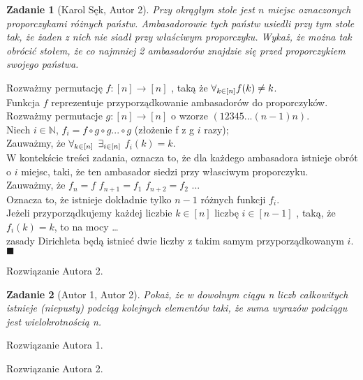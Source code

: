 \documentclass{mwart}
\newcommand{\N}{\mathbb{N}}
\newtheorem{zad}{Zadanie}[section]
\begin{document}
\begin{zad}[Karol Sęk, Autor 2]
    Przy okrągłym stole jest $n$ miejsc oznaczonych proporczykami różnych
    państw. Ambasadorowie tych państw usiedli przy tym stole tak, że żaden z nich nie siadł
    przy właściwym proporczyku. Wykaż, że można tak obrócić stołem, że co najmniej 2
    ambasadorów znajdzie się przed proporczykiem swojego państwa.
\end{zad}
\begin{mdframed}
    Rozważmy permutację $f:[n] \rightarrow [n]$ , taką że $\forall_{\small k\in[n]} f(k) \ne k$.\\
    Funkcja $f$ reprezentuje przyporządkowanie ambasadorów do proporczyków.\\
    Rozważmy permutacje $g:[n] \rightarrow [n]$ o wzorze $(12345...(n-1)n)$.\\
    Niech $i \in \N$, $f_i = f \circ g \circ g ... \circ g$ (złożenie f z g $i$ razy);\\
    Zauważmy, że $\forall_{\small k\in[n]}$ $\exists_{\small i\in[n]}$ $ f_i(k) = k$.\\
    W kontekście treści zadania, oznacza to, że dla każdego ambasadora istnieje obrót o $i$ miejsc, taki, że
    ten ambasador siedzi przy własciwym proporczyku. \\
    Zauważmy, że $f_n = f$ $f_{n+1} = f_1$ $f_{n+2} = f_2$ ...\\
    Oznacza to, że istnieje dokładnie tylko $n-1$ różnych funkcji $f_i$.\\
    Jeżeli przyporządkujemy każdej liczbie $k \in [n]$  liczbę $i \in [n-1]$ , taką, że $f_i(k) =k$, to na mocy \dots\\
    zasady Dirichleta będą istnieć dwie liczby z takim samym przyporządkowanym $i$.\\
     $\blacksquare$
\end{mdframed}
\begin{mdframed}
    Rozwiązanie Autora 2.
\end{mdframed}




\begin{zad}[Autor 1, Autor 2]
    Pokaż, że w dowolnym ciągu n liczb całkowitych istnieje (niepusty)
    podciąg kolejnych elementów taki, że suma wyrazów podciągu jest wielokrotnością n.
\end{zad}
\begin{mdframed}
    Rozwiązanie Autora 1.
\end{mdframed}
\begin{mdframed}
    Rozwiązanie Autora 2.
\end{mdframed}
\end{document}

